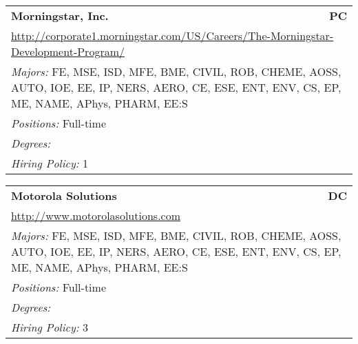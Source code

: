 \documentclass[twoside]{article}
\begin{document}
\begin{center}
\begin{multicols}{3}
\begin{FlushLeft}
\begin{minipage}{\columnwidth}
\end{minipage}
 
\begin{minipage}{\columnwidth}\begin{tabularx}{.95\columnwidth}{Xr}
                 {\Large\bf Morningstar, Inc.} & {\Large\bf PC}\\
    \multicolumn{2}{p{.95\columnwidth}}{\url{http://corporate1.morningstar.com/US/Careers/The-Morningstar-Development-Program/}}\\
    \multicolumn{2}{p{.95\columnwidth}}{\emph{Majors:} FE, MSE, ISD, MFE, BME, CIVIL, ROB, CHEME, AOSS, AUTO, IOE, EE, IP, NERS, AERO, CE, ESE, ENT, ENV, CS, EP, ME, NAME, APhys, PHARM, EE:S}\\
    \multicolumn{2}{p{.95\columnwidth}}{\emph{Positions:} Full-time}\\
    \multicolumn{2}{p{.95\columnwidth}}{\emph{Degrees:} }\\
    \multicolumn{2}{p{.95\columnwidth}}{\emph{Hiring Policy:} 1}\\
    \end{tabularx}
    
\end{minipage}
 
\begin{minipage}{\columnwidth}\begin{tabularx}{.95\columnwidth}{Xr}
                 {\Large\bf Motorola Solutions} & {\Large\bf DC}\\
    \multicolumn{2}{p{.95\columnwidth}}{\url{http://www.motorolasolutions.com}}\\
    \multicolumn{2}{p{.95\columnwidth}}{\emph{Majors:} FE, MSE, ISD, MFE, BME, CIVIL, ROB, CHEME, AOSS, AUTO, IOE, EE, IP, NERS, AERO, CE, ESE, ENT, ENV, CS, EP, ME, NAME, APhys, PHARM, EE:S}\\
    \multicolumn{2}{p{.95\columnwidth}}{\emph{Positions:} Full-time}\\
    \multicolumn{2}{p{.95\columnwidth}}{\emph{Degrees:} }\\
    \multicolumn{2}{p{.95\columnwidth}}{\emph{Hiring Policy:} 3}\\
    \end{tabularx}
    
\end{minipage}
 

\end{FlushLeft}
\end{multicols}
\end{center}
\end{document}
